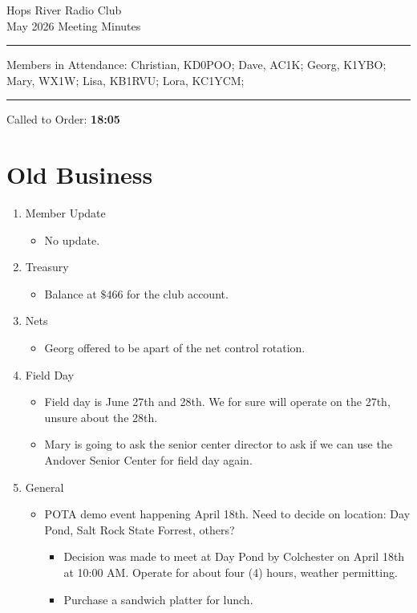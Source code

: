 \documentclass[12pt, letterpaper]{article}
\begin{document}
\begin{center}
	\huge{Hops River Radio Club}\\[10pt]
	\large{May 2026 Meeting Minutes}
\end{center}
\rule{\textwidth}{0.5pt}
	\noindent Members in Attendance: Christian, KD0POO; Dave, AC1K; Georg, K1YBO; Mary, WX1W; Lisa, KB1RVU; Lora, KC1YCM;

\rule{\textwidth}{0.5pt}

Called to Order: \textbf{18:05}

\section{Old Business}
    \begin{enumerate}
    \item Member Update
        \begin{itemize}
            \item  No update.
        \end{itemize}
    \item Treasury
        \begin{itemize}
            \item Balance at $\mathdollar 466$ for the club account.
        \end{itemize}
    \item Nets
        \begin{itemize}
            \item Georg offered to be apart of the net control rotation.
        \end{itemize}
    \item Field Day
        \begin{itemize}
            \item Field day is June 27th and 28th. We for sure will operate on the 27th, unsure about the 28th.
            \item Mary is going to ask the senior center director to ask if we can use the Andover Senior Center for field day again. 
        \end{itemize}
    \item General
        \begin{itemize}
            \item POTA demo event happening April 18th. Need to decide on location: Day Pond, Salt Rock State Forrest, others?
                \begin{itemize}
                    \item Decision was made to meet at Day Pond by Colchester on April 18th at 10:00 AM. Operate for about four (4) hours, weather permitting.
                    \item Purchase a sandwich platter for lunch.
                \end{itemize}
        \end{itemize}
    \end{enumerate}
\end{document}
